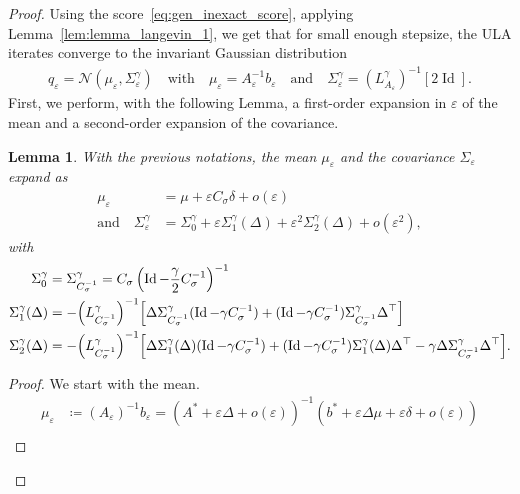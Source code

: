 \documentclass[11pt]{article}
\newtheorem{lem}{Lemma}
\newcommand{\eqdef}{\coloneqq}
\newcommand{\id}{\operatorname{Id}}
\begin{document}
\begin{proof} 

Using the score~\eqref{eq:gen_inexact_score}, applying Lemma~\ref{lem:lemma_langevin_1}, we get that for small enough stepsize, the ULA iterates converge to the invariant Gaussian distribution 
\begin{align*}
q_\varepsilon = \mathcal{N}(\mu_\varepsilon, \Sigma^\gamma_\varepsilon) \quad \text{with} \quad \mu_\varepsilon = A_\varepsilon^{-1} b_\varepsilon \quad \text{and} \quad \Sigma^\gamma_\varepsilon = (L^\gamma_{A_\varepsilon})^{-1}[2\id].
\end{align*}
First, we perform, with the following Lemma, a first-order expansion in $\varepsilon$ of the mean and a second-order expansion of the covariance. %
\begin{lem} \label{lem:Langevin_1}
With the previous notations, the mean $\mu_\varepsilon$ and the covariance $\Sigma_\varepsilon$ expand as 
\begin{align*}
\mu_\varepsilon &=  \mu + \varepsilon C_\sigma \delta   + o(\varepsilon)  \\
\text{and} \quad\Sigma^\gamma_\varepsilon &= \Sigma_0^\gamma  + \varepsilon \Sigma^\gamma_1(\Delta) + \varepsilon^2 \Sigma^\gamma_2(\Delta) + o(\varepsilon^2),
\end{align*}
with 
 \begin{align} \label{eq:Sigma_0}
\Sigma_0^\gamma &= \Sigma^\gamma_{C_\sigma^{-1}} = C_\sigma\left( \id - \frac{\gamma}{2} C_\sigma^{-1} \right)^{-1} \\
\Sigma_1^\gamma(\Delta) &= -\Bigl(L^\gamma_{C_\sigma^{-1}}\Bigr)^{-1}\Bigl[
\Delta \Sigma^\gamma_{C_\sigma^{-1}} (\id - \gamma {C_\sigma^{-1}}) + (\id - \gamma {C_\sigma^{-1}})\Sigma^\gamma_{{C_\sigma^{-1}}} \Delta^\top
\Bigr] \label{eq:Sigma_1}
\\
\Sigma_2^\gamma(\Delta) &= -\Bigl(L^\gamma_{C_\sigma^{-1}}\Bigr)^{-1}\Bigl[
\Delta \Sigma^\gamma_{{1}}(\Delta) (\id - \gamma {C_\sigma^{-1}}) + (\id - \gamma {C_\sigma^{-1}})\Sigma^\gamma_{{1}}(\Delta) \Delta^\top- \gamma   \Delta  \Sigma^\gamma_{{C_\sigma^{-1}}}  \Delta^\top
\Bigr]. \label{eq:Sigma_2}
\end{align}
\end{lem}
\begin{proof}
We start with the mean. 
 \begin{align*}
 \mu_\varepsilon &\eqdef (A_\varepsilon)^{-1}b_\varepsilon = \left( A^* + \varepsilon \Delta + o(\varepsilon) \right)^{-1} (b^* + \varepsilon\Delta\mu + \varepsilon \delta + o(\varepsilon)) \\

\end{align*}
\end{proof}
\end{proof}
\end{document}
